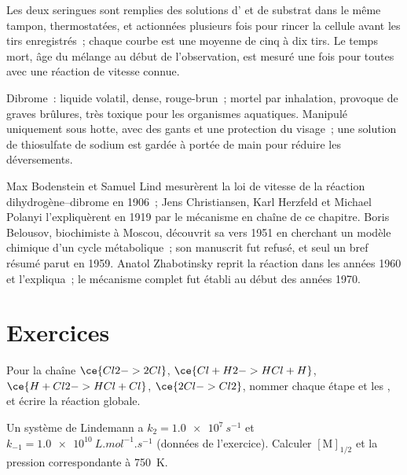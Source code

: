 \begin{inthelab}
Les deux seringues sont remplies des solutions d' et de substrat
dans le même tampon, thermostatées, et actionnées plusieurs fois pour
rincer la cellule avant les tirs enregistrés~; chaque courbe est une
moyenne de cinq à dix tirs. Le temps mort, âge du mélange au début de
l'observation, est mesuré une fois pour toutes avec une réaction de
vitesse connue.
\end{inthelab}

\begin{safety}{}
Dibrome~: liquide volatil, dense, rouge-brun~; mortel par inhalation,
provoque de graves brûlures, très toxique pour les organismes
aquatiques. Manipulé uniquement sous hotte, avec des gants et une
protection du visage~; une solution de thiosulfate de sodium est gardée à
portée de main pour réduire les déversements.
\end{safety}

\begin{history}
Max Bodenstein et Samuel Lind mesurèrent la loi de vitesse de la réaction
dihydrogène--dibrome en 1906~; Jens Christiansen, Karl Herzfeld et
Michael Polanyi l'expliquèrent en 1919 par le mécanisme en chaîne de ce
chapitre. Boris Belousov, biochimiste à Moscou, découvrit sa  vers 1951 en cherchant un modèle chimique d'un cycle
métabolique~; son manuscrit fut refusé, et seul un bref résumé parut en
1959. Anatol Zhabotinsky reprit la réaction dans les années 1960 et
l'expliqua~; le mécanisme complet fut établi au début des années 1970.
\end{history}

\section{Exercices}

\begin{exercise}[$\star$]\label{exo:b3:complex-kinetics:1}
Pour la chaîne $\ce{Cl2 -> 2 Cl}$, $\ce{Cl + H2 -> HCl + H}$, $\ce{H + Cl2 -> HCl + Cl}$, $\ce{2 Cl -> Cl2}$,
nommer chaque étape et les , et écrire la réaction
globale.
\end{exercise}

\begin{exercise}[$\star$]\label{exo:b3:complex-kinetics:2}
Un système de Lindemann a $k_2 = \qty{1.0e7}{s^{-1}}$ et $k_{-1} = \qty{1.0e10}{L.mol^{-1}.s^{-1}}$
(données de l'exercice). Calculer $[\mathrm M]_{1/2}$ et la pression
correspondante à \qty{750}{K}.
\end{exercise}

